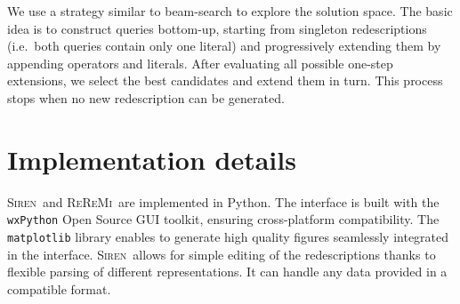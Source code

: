 \documentclass{sig-alternate}
\newcommand{\Siren}{\textsc{Siren}}
\newcommand{\ReReMi}{\textsc{ReReMi}}
\begin{document}
We use a strategy similar to beam-search to explore the
solution space.  The basic idea is to construct queries bottom-up,
starting from singleton redescriptions (i.e.\ both queries contain
only one literal) and progressively extending them by appending
operators and literals. %
After evaluating all
possible one-step extensions, we select the best candidates and extend
them in turn. This process stops when no new redescription can
be generated.


\section{Implementation details}
\Siren\ and \ReReMi\ are implemented in Python.  The interface is built
with the \texttt{wxPython} Open Source GUI toolkit, ensuring
cross-platform compatibility.  The \texttt{matplotlib} library enables
to generate high quality figures seamlessly integrated in the
interface.  \Siren\ allows for simple editing of the redescriptions thanks to flexible parsing of different representations. It can handle any data provided in a compatible
format.
\end{document}
